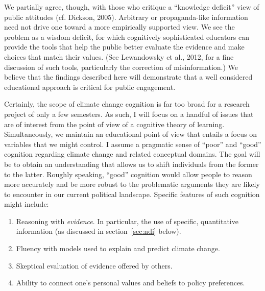 We partially agree, though, with those who critique a ``knowledge deficit'' view
of public attitudes (cf. Dickson, 2005). Arbitrary or propaganda-like
information need not drive one toward a more empirically supported view. We see
the problem as a wisdom deficit, for which cognitively sophisticated educators
can provide the tools that help the public better evaluate the evidence and make
choices that match their values. (See Lewandowsky et al., 2012, for a fine
discussion of such tools, particularly the correction of misinformation.) We
believe that the findings described here will demonstrate that a well considered
educational approach is critical for public engagement.




Certainly, the scope of climate change cognition is far too broad for a research
project of only a few semesters. As such, I will focus on a handful of issues
that are of interest from the point of view of a cognitive theory of learning.
Simultaneously, we maintain an educational point of view that entails a focus on
variables that we might control. I assume a pragmatic sense of ``poor'' and
``good'' cognition regarding climate change and related conceptual domains. The
goal will be to obtain an understanding that allows us to shift individuals from
the former to the latter. Roughly speaking, ``good'' cognition would allow
people to reason more accurately and be more robust to the problematic
arguments they are likely to encounter in our current political landscape.
Specific features of such cognition might include:

\begin{enumerate}
\item Reasoning with \emph{evidence}. In particular, the use of specific,
quantitative information (as discussed in section~\ref{sec:ndi} below).
\item Fluency with models used to explain and predict climate change.
\item Skeptical evaluation of evidence offered by others.
\item Ability to connect one's personal values and beliefs to policy
preferences.
\end{enumerate}


